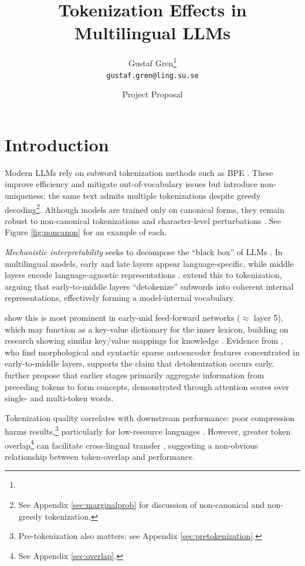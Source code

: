\documentclass[a4paper]{article}
\title{Tokenization Effects in Multilingual LLMs}
\author{Gustaf Gren\thanks{\thankstext} \\ \texttt{gustaf.gren@ling.su.se}}
\date{Project Proposal}
\begin{document}
\maketitle

\section{Introduction}

Modern LLMs rely on subword tokenization methods such as BPE \parencite{bpe,bpe2}. These improve efficiency and mitigate out-of-vocabulary issues \parencite{mielke2021} but introduce non-uniqueness: the same text admits multiple tokenizations despite greedy decoding\footnote{See Appendix \ref{sec:marginalprob} for discussion of non-canonical and non-greedy tokenization.}. Although models are trained only on canonical forms, they remain robust to non-canonical tokenizations and character-level perturbations \parencite{zheng2025, liu2025}. See Figure \ref{fig:noncanon} for an example of each.



\textit{Mechanistic interpretability} seeks to decompose the ``black box'' of LLMs \parencite{zhang2026}. In multilingual models, early and late layers appear language-specific, while middle layers encode language-agnostic representations \parencite{huang2025, tang2024, conneau2020, mousi2024, wendler2024, basirat2025}. \textcite{kaplan2025} extend this to tokenization, arguing that early-to-middle layers ``detokenize'' subwords into coherent internal representations, effectively forming a model-internal vocabulary.

\textcite{kaplan2025} show this is most prominent in early-mid feed-forward networks ($\approx$ layer 5), which may function as a key-value dictionary for the inner lexicon, building on research showing similar key/value mappings for knowledge \parencite{meng2022, geva2022, geva2021}. Evidence from \textcite{jing2025}, who find morphological and syntactic sparse autoencoder features concentrated in early-to-middle layers, supports the claim that detokenization occurs early. \textcite{kaplan2025} further propose that earlier stages primarily aggregate information from preceding tokens to form concepts, demonstrated through attention scores over single- and multi-token words.

Tokenization quality correlates with downstream performance: poor compression harms results,\footnote{Pre-tokenization also matters; see Appendix \ref{sec:pretokenization}.} particularly for low-resource languages \parencite{goldman2024, ahia2023}. However, greater token overlap\footnote{See Appendix \ref{sec:overlap}.} can facilitate cross-lingual transfer \parencite{kallini2025, hammerl2025, limisiewicz2023}, suggesting a non-obvious relationship between token-overlap and performance.
\end{document}

